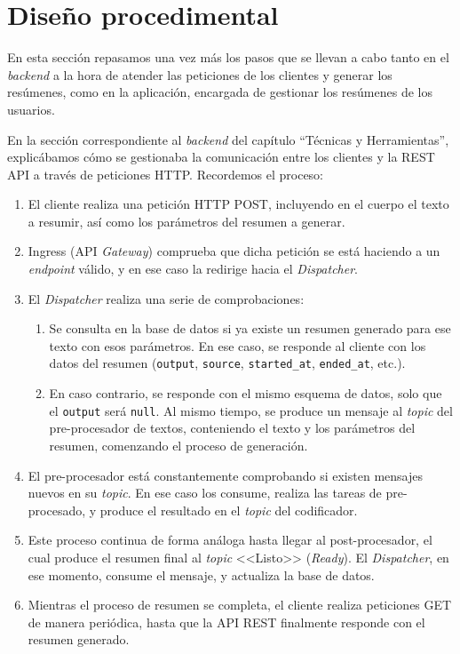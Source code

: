 \section{Diseño procedimental}

En esta sección repasamos una vez más los pasos que se llevan a cabo tanto en el \emph{backend} a la hora de atender las peticiones de los clientes y generar los resúmenes, como en la aplicación, encargada de gestionar los resúmenes de los usuarios.

En la sección correspondiente al \emph{backend} del capítulo ``Técnicas y Herramientas'', explicábamos cómo se gestionaba la comunicación entre los clientes y la REST API a través de peticiones HTTP. Recordemos el proceso:

\begin{enumerate}
	\item El cliente realiza una petición HTTP POST, incluyendo en el cuerpo el texto a resumir, así como los parámetros del resumen a generar.
	
	\item Ingress (API \emph{Gateway}) comprueba que dicha petición se está haciendo a un \emph{endpoint} válido, y en ese caso la redirige hacia el \emph{Dispatcher}.
	
	\item El \emph{Dispatcher} realiza una serie de comprobaciones:
	\begin{enumerate}	
		\item Se consulta en la base de datos si ya existe un resumen generado para ese texto con esos parámetros. En ese caso, se responde al cliente con los datos del resumen (\texttt{output}, \texttt{source}, \texttt{started\_at}, \texttt{ended\_at}, etc.).
		
		\item En caso contrario, se responde con el mismo esquema de datos, solo que el \texttt{output} será \texttt{null}. Al mismo tiempo, se produce un mensaje al \emph{topic} del pre-procesador de textos, conteniendo el texto y los parámetros del resumen, comenzando el proceso de generación.
	\end{enumerate}
	
	\item El pre-procesador está constantemente comprobando si existen mensajes nuevos en su \emph{topic}. En ese caso los consume, realiza las tareas de pre-procesado, y produce el resultado en el \emph{topic} del codificador.
	
	\item Este proceso continua de forma análoga hasta llegar al post-procesador, el cual produce el resumen final al \emph{topic} <<Listo>> (\emph{Ready}). El \emph{Dispatcher}, en ese momento, consume el mensaje, y actualiza la base de datos.
	
	\item Mientras el proceso de resumen se completa, el cliente realiza peticiones GET de manera periódica, hasta que la API REST finalmente responde con el resumen generado.
\end{enumerate}

